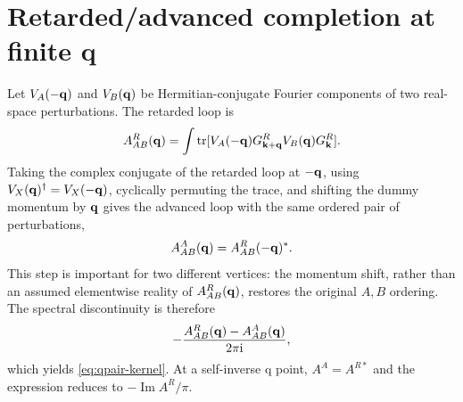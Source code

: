\section{Retarded/advanced completion at finite q}
\label{app:qpair}

Let $V_A(-\mathbf q)$ and $V_B(\mathbf q)$ be Hermitian-conjugate Fourier components of two real-space perturbations. The retarded loop is
\begin{equation}
A^R_{AB}(\mathbf q)=\int\operatorname{tr}[V_A(-\mathbf q)G^R_{\mathbf k+\mathbf q}V_B(\mathbf q)G^R_\mathbf k].
\end{equation}
Taking the complex conjugate of the retarded loop at $-\mathbf q$, using $V_X(\mathbf q)^\dagger=V_X(-\mathbf q)$, cyclically permuting the trace, and shifting the dummy momentum by $\mathbf q$ gives the advanced loop with the same ordered pair of perturbations,
\begin{equation}
A^A_{AB}(\mathbf q)=A^R_{AB}(-\mathbf q)^*.
\label{eq:qpair-advanced}
\end{equation}
This step is important for two different vertices: the momentum shift, rather than an assumed elementwise reality of $A^R_{AB}(\mathbf q)$, restores the original $A,B$ ordering.
The spectral discontinuity is therefore
\begin{equation}
-\frac{A^R_{AB}(\mathbf q)-A^A_{AB}(\mathbf q)}{2\pi\mathrm{i}},
\end{equation}
which yields \cref{eq:qpair-kernel}. At a self-inverse q point, $A^A=A^{R*}$ and the expression reduces to $-\operatorname{Im}A^R/\pi$.
